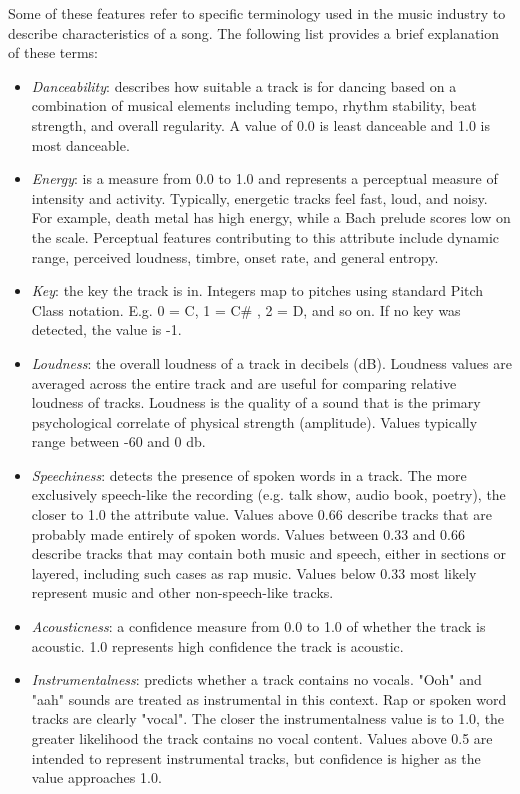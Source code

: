 \documentclass[11pt]{article} %
\begin{document}
Some of these features refer to specific terminology used in the music industry to describe characteristics of a song. The following list \cite{spotifyApi} provides a brief explanation of these terms:

\begin{itemize}
	\item \textit{Danceability}: describes how suitable a track is for dancing based on a combination of musical elements including tempo, rhythm stability, beat strength, and overall regularity. A value of 0.0 is least danceable and 1.0 is most danceable.
	\item \textit{Energy}: is a measure from 0.0 to 1.0 and represents a perceptual measure of intensity and activity. Typically, energetic tracks feel fast, loud, and noisy. For example, death metal has high energy, while a Bach prelude scores low on the scale. Perceptual features contributing to this attribute include dynamic range, perceived loudness, timbre, onset rate, and general entropy.
	\item \textit{Key}: the key the track is in. Integers map to pitches using standard Pitch Class notation. E.g. 0 = C, 1 = C\# , 2 = D, and so on. If no key was detected, the value is -1.  
	\item \textit{Loudness}: the overall loudness of a track in decibels (dB). Loudness values are averaged across the entire track and are useful for comparing relative loudness of tracks. Loudness is the quality of a sound that is the primary psychological correlate of physical strength (amplitude). Values typically range between -60 and 0 db.
	\item \textit{Speechiness}: detects the presence of spoken words in a track. The more exclusively speech-like the recording (e.g. talk show, audio book, poetry), the closer to 1.0 the attribute value. Values above 0.66 describe tracks that are probably made entirely of spoken words. Values between 0.33 and 0.66 describe tracks that may contain both music and speech, either in sections or layered, including such cases as rap music. Values below 0.33 most likely represent music and other non-speech-like tracks.
	\item \textit{Acousticness}: a confidence measure from 0.0 to 1.0 of whether the track is acoustic. 1.0 represents high confidence the track is acoustic.
	\item \textit{Instrumentalness}: predicts whether a track contains no vocals. "Ooh" and "aah" sounds are treated as instrumental in this context. Rap or spoken word tracks are clearly "vocal". The closer the instrumentalness value is to 1.0, the greater likelihood the track contains no vocal content. Values above 0.5 are intended to represent instrumental tracks, but confidence is higher as the value approaches 1.0.

\end{itemize}
\end{document}
